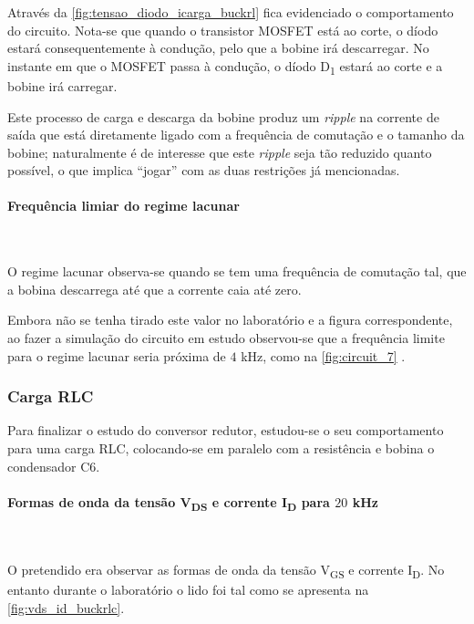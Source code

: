 \documentclass[a4paper,11pt]{article}
\numberwithin{equation}{section}
\begin{document}
Através da \autoref{fig:tensao_diodo_icarga_buckrl} fica evidenciado o comportamento do circuito. Nota-se que quando o transistor MOSFET está ao corte, o díodo estará consequentemente à condução, pelo que a bobine irá descarregar. No instante em que o MOSFET passa à condução, o díodo D\textsubscript{1} estará ao corte e a bobine irá carregar. 

Este processo de carga e descarga da bobine produz um \textit{ripple} na corrente de saída que está diretamente ligado com a frequência de comutação e o tamanho da bobine; naturalmente é de interesse que este \textit{ripple} seja tão reduzido quanto possível, o que implica ``jogar'' com as duas restrições já mencionadas.

\paragraph{Frequência limiar do regime lacunar}\mbox{}\

O regime lacunar observa-se quando se tem uma frequência de comutação tal, que a bobina descarrega até que a corrente caia até zero.

Embora não se tenha tirado este valor no laboratório e a figura correspondente, ao fazer a simulação do circuito em estudo observou-se que a frequência limite para o regime lacunar seria próxima de $4$ kHz, como na \autoref{fig:circuit_7}  .

\subsubsection{Carga RLC}

Para finalizar o estudo do conversor redutor, estudou-se o seu comportamento para uma carga RLC, colocando-se em paralelo com a resistência e bobina o condensador C6.

\paragraph{Formas de onda da tensão V\textsubscript{DS} e corrente I\textsubscript{D} para $20$ kHz}\mbox{}\

O pretendido era observar as formas de onda da tensão V\textsubscript{GS} e corrente I\textsubscript{D}. No entanto durante o laboratório o lido foi tal como se apresenta na \autoref{fig:vds_id_buckrlc}.
\end{document}
